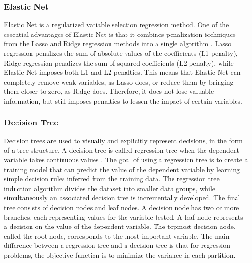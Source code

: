 \documentclass{bmcart}
\begin{document}
\subsubsection*{\textbf{Elastic Net}}
Elastic Net is a regularized variable selection regression method. One of the essential advantages of Elastic Net is that it combines penalization techniques from the Lasso and Ridge regression methods into a single algorithm \cite{hastie2009elements}. Lasso regression penalizes the sum of absolute values of the coefficients (L1 penalty), Ridge regression penalizes the sum of squared coefficients (L2 penalty), while Elastic Net imposes both L1 and L2 penalties. This means that Elastic Net can completely remove weak variables, as Lasso does, or reduce them by bringing them closer to zero, as Ridge does. 
Therefore, it does not lose valuable information, but still imposes penalties to lessen the impact of certain variables.

\subsubsection*{\textbf{Decision Tree}} Decision trees are used to visually and explicitly represent decisions, in the form of a tree structure. A decision tree is called regression tree when the dependent variable takes continuous values \cite{hastie2009elements}. 
The goal of using a regression tree is to create a training model that can predict the value of the dependent variable by learning simple decision rules inferred from the training data.
The regression tree induction algorithm divides the dataset into smaller data groups, while simultaneously an associated decision tree is incrementally developed. 
The final tree consists of decision nodes and leaf nodes. A decision node has two or more branches, each representing values for the variable tested. A leaf node represents a decision on the value of the dependent variable. The topmost decision node, called the root node, corresponds to the most important variable.
The main difference between a regression tree and a decision tree is that for regression problems, the objective function is to minimize the variance in each partition.
\end{document}
